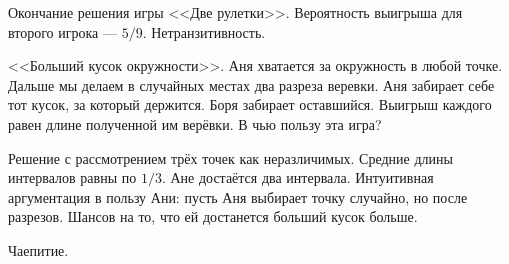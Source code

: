 \documentclass[pdftex,12pt,a4paper]{article}
\begin{document}
Окончание решения игры <<Две рулетки>>. Вероятность выигрыша для второго игрока --- $5/9$. Нетранзитивность.


<<Больший кусок окружности>>. Аня хватается за окружность в любой точке. Дальше мы делаем в случайных местах два разреза веревки. Аня забирает себе тот кусок, за который держится. Боря забирает оставшийся. Выигрыш каждого равен длине полученной им верёвки. В чью пользу эта игра?


Решение с рассмотрением трёх точек как неразличимых. Средние длины интервалов равны по $1/3$. Ане достаётся два интервала. Интуитивная аргументация в пользу Ани: пусть Аня выбирает точку случайно, но после разрезов. Шансов на то, что ей достанется больший кусок больше.


Чаепитие.
\end{document}
